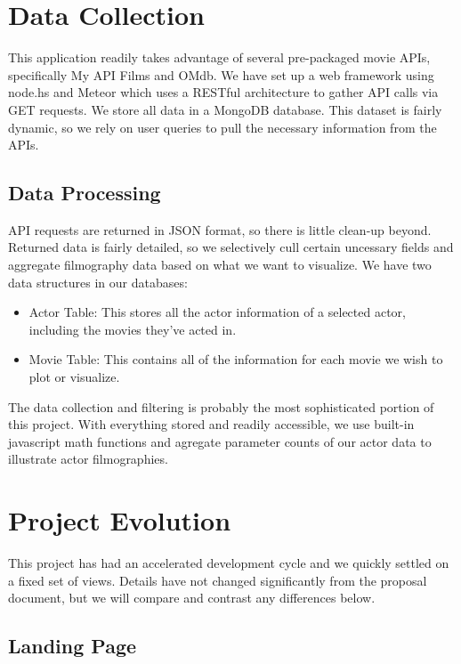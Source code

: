 \documentclass[12pt]{article}
\begin{document}
\newpage 

\section{Data Collection}
	This application readily takes advantage of several pre-packaged movie APIs, specifically My API Films and OMdb. We have set up a web framework using node.hs and Meteor which uses a RESTful architecture to gather API calls via GET requests. We store all data in a MongoDB database. This dataset is fairly dynamic, so we rely on user queries to pull the necessary information from the APIs.
	
\subsection{Data Processing}
	API requests are returned in JSON format, so there is little clean-up beyond. Returned data is fairly detailed, so we selectively cull certain uncessary fields and aggregate filmography data based on what we want to visualize. We have two data structures in our databases:
	
	\begin{itemize}
		\item Actor Table: This stores all the actor information of a selected actor, including the movies they've acted in.
		\item Movie Table: This contains all of the information for each movie we wish to plot or visualize.
	\end{itemize}
	
	The data collection and filtering is probably the most sophisticated portion of this project. With everything stored and readily accessible, we use built-in javascript math functions and agregate parameter counts of our actor data to illustrate actor filmographies.

\newpage 

\section{Project Evolution}

This project has had an accelerated development cycle and we quickly settled on a fixed set of views.  Details have not changed significantly from the proposal document, but we will compare and contrast any differences below.

\subsection{Landing Page}
\end{document}
